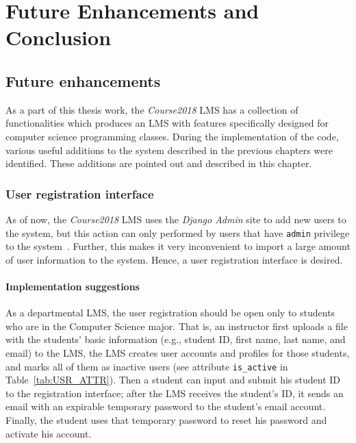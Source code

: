 

\chapter{Future Enhancements and Conclusion}
\label{chap:FUTURE}

\section{Future enhancements}
As a part of this thesis work, 
the \emph{Course2018} LMS has a collection of functionalities which produces an
LMS with features specifically designed for computer science programming
classes.
During the implementation of the code, various useful additions to the system
described in the previous chapters were identified.
These additions are pointed out and described in this chapter.

\subsection{User registration interface}
As of now, the \emph{Course2018} LMS uses the \emph{Django Admin} site to
add new users to the system, but this action can only performed by users that
have \texttt{admin} privilege to the system~\cite{djangoAdmin}. Further, this
makes it very inconvenient to import a large amount of user information to the system.
Hence, a user registration interface is desired.

\subsubsection{Implementation suggestions}
As a departmental LMS, the user registration should be open only to students
who are in the Computer Science major.
That is, an instructor first uploads a file with the students' basic information
(e.g., student ID, first name, last name, and email) to the LMS, the LMS
creates user accounts and profiles for those students, and marks all of them
as inactive users (see attribute \texttt{is\_active} in
Table~\ref{tab:USR_ATTR}).
Then a student can input and submit his student ID to the registration
interface; after the LMS receives the student's ID,
it sends an email with an expirable temporary password to the student's
email account.
Finally, the student uses that temporary password to reset his password and
activate his account.

